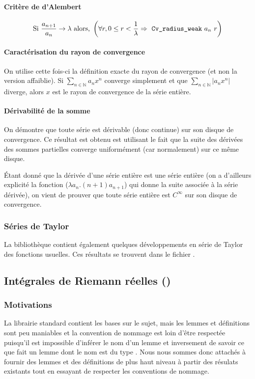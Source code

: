 \paragraph{Critère de d'Alembert} $$\text{Si } \frac{a_{n + 1}}{a_n} \rightarrow \lambda \text{ alors, } \left( \forall r, 0 \le r < \frac{1}{\lambda} \Rightarrow \text{ \texttt{Cv\_radius\_weak} } a_n~ r\right)$$

\paragraph{Caractérisation du rayon de convergence} On utilise cette fois-ci la définition exacte du rayon de convergence (et non la version affaiblie). Si $\sum_{n\in \mathbb{N}} a_n x^n$ converge simplement et que $\sum_{n\in \mathbb{N}} |a_n x^n|$ diverge, alors $x$ est le rayon de convergence de la série entière.

\paragraph{Dérivabilité de la somme} On démontre que toute série est dérivable (donc continue) sur son disque de convergence. Ce résultat est obtenu est utilisant le fait que la suite des dérivées des sommes partielles converge uniformément (car normalement) sur ce même disque.

Étant donné que la dérivée d'une série entière est une série entière (on a d'ailleurs explicité la fonction  ($\lambda a_n.(n+1)a_{n+1}$) qui donne la suite associée à la série dérivée), on vient de prouver que toute série entière est $C^{\infty}$ sur son disque de convergence.

\subsubsection{Séries de Taylor}

La bibliothèque contient également quelques développements en série de Taylor des fonctions usuelles. Ces résultats se trouvent dans le fichier .

\subsection{Intégrales de Riemann réelles ()}

\subsubsection{Motivations}
	La librairie standard contient les bases sur le sujet, mais les lemmes et définitions sont peu maniables et la convention de nommage est loin d'être respectée puisqu'il est impossible d'inférer le nom d'un lemme et inversement de savoir ce que fait un lemme dont le nom est du type .
	Nous nous sommes donc attachés à fournir des lemmes et des définitions de plus haut niveau à partir des résulats existants tout en essayant de respecter les conventions de nommage.

